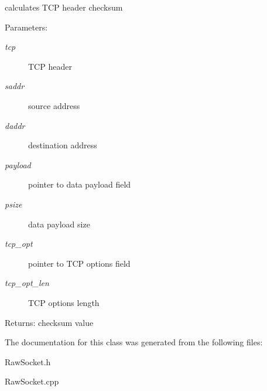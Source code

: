 calculates TCP header checksum 

\begin{Desc}
\item[Parameters:]
\begin{description}
\item[{\em tcp}]TCP header \item[{\em saddr}]source address \item[{\em daddr}]destination address \item[{\em payload}]pointer to data payload field \item[{\em psize}]data payload size \item[{\em tcp\_\-opt}]pointer to TCP options field \item[{\em tcp\_\-opt\_\-len}]TCP options length \end{description}
\end{Desc}
\begin{Desc}
\item[Returns:]checksum value \end{Desc}


The documentation for this class was generated from the following files:\begin{CompactItemize}
\item 
RawSocket.h\item 
RawSocket.cpp\end{CompactItemize}
